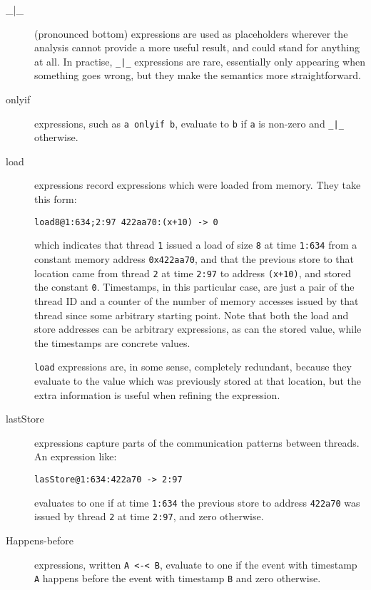 \documentclass[10pt,a4paper,twocolumn]{article}
\begin{document}
\begin{description}
\item[\_|\_] (pronounced bottom) expressions are used as placeholders
  wherever the analysis cannot provide a more useful result, and could
  stand for anything at all.  In practise, \verb^_|_^ expressions are
  rare, essentially only appearing when something goes wrong, but they
  make the semantics more straightforward.

\item[onlyif] expressions, such as \verb|a onlyif b|, evaluate to
  \verb|b| if \verb|a| is non-zero and \verb^_|_^ otherwise.  

\item[load] expressions record expressions which were loaded from
  memory.  They take this form:

\begin{verbatim}
load8@1:634;2:97 422aa70:(x+10) -> 0
\end{verbatim}

  which indicates that thread \verb|1| issued a load of size \verb|8|
  at time \verb|1:634| from a constant memory address
  \verb|0x422aa70|, and that the previous store to that location came
  from thread \verb|2| at time \verb|2:97| to address \verb|(x+10)|,
  and stored the constant \verb|0|.  Timestamps, in this particular
  case, are just a pair of the thread ID and a counter of the number
  of memory accesses issued by that thread since some arbitrary
  starting point.  Note that both the load and store addresses can be
  arbitrary expressions, as can the stored value, while the timestamps
  are concrete values.

  \verb|load| expressions are, in some sense, completely redundant,
  because they evaluate to the value which was previously stored at
  that location, but the extra information is useful when refining the
  expression.

\item[lastStore] expressions capture parts of the communication
  patterns between threads.  An expression like:

\begin{verbatim}
lasStore@1:634:422a70 -> 2:97
\end{verbatim}

  evaluates to one if at time \verb|1:634| the previous store to
  address \verb|422a70| was issued by thread \verb|2| at time
  \verb|2:97|, and zero otherwise.

\item[Happens-before] expressions, written \verb|A <-< B|, evaluate to
  one if the event with timestamp \verb|A| happens before the event
  with timestamp \verb|B| and zero otherwise.


\end{description}
\end{document}
